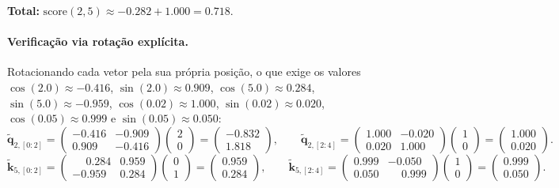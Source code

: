 \documentclass{dlproblemset}
\begin{document}
\bigskip
\textbf{Total:} $\mathrm{score}(2,5) \approx -0.282 + 1.000 = 0.718$.

\paragraph{Verificação via rotação explícita.}
Rotacionando cada vetor pela sua própria posição, o que exige os valores
$\cos(2.0) \approx -0.416$, $\sin(2.0) \approx 0.909$, $\cos(5.0) \approx 0.284$,
$\sin(5.0) \approx -0.959$, $\cos(0.02) \approx 1.000$, $\sin(0.02) \approx 0.020$,
$\cos(0.05) \approx 0.999$ e $\sin(0.05) \approx 0.050$:
\[
  \tilde{\mathbf{q}}_{2,[0:2]}
  = \begin{pmatrix}-0.416 & -0.909 \\ 0.909 & -0.416\end{pmatrix}
    \begin{pmatrix}2\\0\end{pmatrix}
  = \begin{pmatrix}-0.832\\ 1.818\end{pmatrix},
  \qquad
  \tilde{\mathbf{q}}_{2,[2:4]}
  = \begin{pmatrix}1.000 & -0.020 \\ 0.020 & 1.000\end{pmatrix}
    \begin{pmatrix}1\\0\end{pmatrix}
  = \begin{pmatrix}1.000\\ 0.020\end{pmatrix}.
\]
\[
  \tilde{\mathbf{k}}_{5,[0:2]}
  = \begin{pmatrix}\phantom{-}0.284 & 0.959 \\ -0.959 & 0.284\end{pmatrix}
    \begin{pmatrix}0\\1\end{pmatrix}
  = \begin{pmatrix}0.959\\ 0.284\end{pmatrix},
  \qquad
  \tilde{\mathbf{k}}_{5,[2:4]}
  = \begin{pmatrix}0.999 & -0.050 \\ 0.050 & \phantom{-}0.999\end{pmatrix}
    \begin{pmatrix}1\\0\end{pmatrix}
  = \begin{pmatrix}0.999\\ 0.050\end{pmatrix}.
\]
\end{document}
